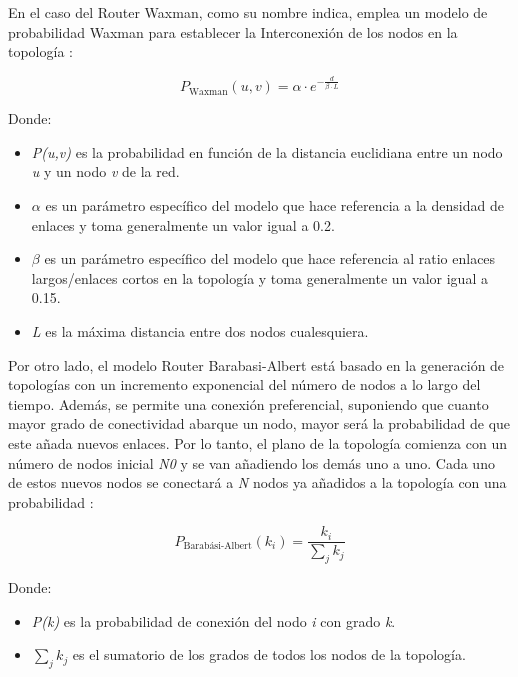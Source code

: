 \vspace{3mm}

En el caso del Router Waxman, como su nombre indica, emplea un modelo de probabilidad Waxman para establecer la Interconexión de los nodos en la topología \cite{brite_zegura}:

\[P_{\text{Waxman}}(u,v) = \alpha \cdot e^{-\frac{d}{\beta \cdot L}}\]
    
    Donde:
\begin{itemize}
    \renewcommand{\labelitemi}{}
    \item \textit{P(u,v)} es la probabilidad en función de la distancia euclidiana entre un nodo \textit{u} y un nodo \textit{v} de la red.
    \item $\alpha$ es un parámetro específico del modelo que hace referencia a la densidad de enlaces y toma generalmente un valor igual a 0.2.
    \item $\beta$ es un parámetro específico del modelo que hace referencia al ratio enlaces largos/enlaces cortos en la topología y toma generalmente un valor igual a 0.15.
    \item \textit{L} es la máxima distancia entre dos nodos cualesquiera.
\end{itemize}

\vspace{3mm}

Por otro lado, el modelo Router Barabasi-Albert está basado en la generación de topologías con un incremento exponencial del número de nodos a lo largo del tiempo. Además, se permite una conexión preferencial, suponiendo que cuanto mayor grado de conectividad abarque un nodo, mayor será la probabilidad de que este añada nuevos enlaces. Por lo tanto, el plano de la topología comienza con un número de nodos inicial \textit{N0} y se van añadiendo los demás uno a uno. Cada uno de estos nuevos nodos se conectará a \textit{N} nodos ya añadidos a la topología con una probabilidad \cite{brite_zegura}:

\[P_{\text{Barabási-Albert}}(k_i) = \frac{k_i}{\sum_{j}^{}k_j}\]
    
    Donde:
\begin{itemize}
    \renewcommand{\labelitemi}{}
    \item \textit{P(k)} es la probabilidad de conexión del nodo \textit{i} con grado \textit{k}.
    \item $\sum_{j}^{}k_j$ es el sumatorio de los grados de todos los nodos de la topología.
\end{itemize}

